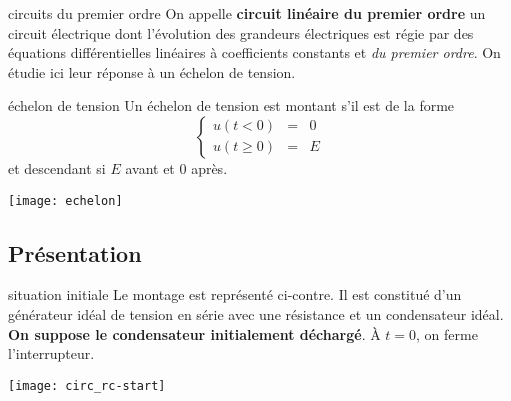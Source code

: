 \documentclass[../main/main.tex]{subfiles}
\begin{document}
\begin{tcbraster}[raster columns=2, raster equal height=rows]
    \begin{defi}[label=def:circordre1]{circuits du premier ordre}
        On appelle \textbf{circuit linéaire du premier ordre} un circuit électrique
        dont l'évolution des grandeurs électriques est régie par des équations
        différentielles linéaires à coefficients constants et \textit{du premier
        ordre}. On étudie ici leur réponse à un échelon de tension.
    \end{defi}
    \begin{defi}[label=def:echelon, sidebyside]{échelon de tension}
        Un échelon de tension est montant s'il est de la forme
        \[ \left\{
                \begin{array}{rcl}
                    u(t<0)    & = & 0 \\
                    u(t\geq0) & = & E
                \end{array}
        \right.\]
        et descendant si $E$ avant et 0 après.
        \tcblower
        \begin{center}
            \texttt{[image: echelon]}
        \end{center}
    \end{defi}
\end{tcbraster}

\subsection{Présentation}
\begin{defi}[label=def:echelonC, sidebyside]{situation initiale}
    Le montage est représenté ci-contre. Il est constitué d'un générateur idéal
    de tension en série avec une résistance et un condensateur idéal. \textbf{On
    suppose le condensateur initialement déchargé}. À $t=0$, on ferme
    l'interrupteur.
    \tcblower
    \begin{center}
        \texttt{[image: circ\_rc-start]}
    \end{center}
\end{defi}
\end{document}
